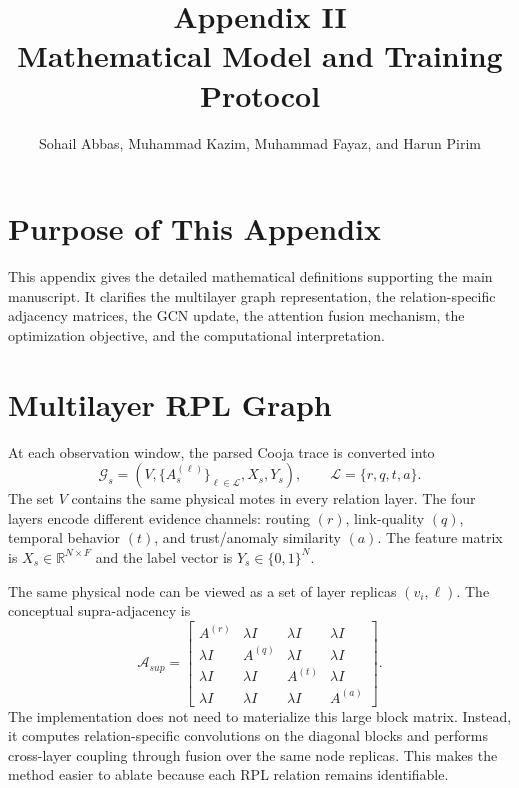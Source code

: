 \documentclass[10pt]{article}
\title{\vspace{-1.2cm}Appendix II\\Mathematical Model and Training Protocol}
\author{Sohail Abbas, Muhammad Kazim, Muhammad Fayaz, and Harun Pirim}
\date{}
\begin{document}
\maketitle

\section{Purpose of This Appendix}
This appendix gives the detailed mathematical definitions supporting the main manuscript. It clarifies the multilayer graph representation, the relation-specific adjacency matrices, the GCN update, the attention fusion mechanism, the optimization objective, and the computational interpretation.

\section{Multilayer RPL Graph}
At each observation window, the parsed Cooja trace is converted into
\begin{equation}
\mathcal{G}_s=(V,\{A_s^{(\ell)}\}_{\ell\in\mathcal{L}},X_s,Y_s),
\qquad
\mathcal{L}=\{r,q,t,a\}.
\label{eq:app2_graph}
\end{equation}
The set $V$ contains the same physical motes in every relation layer. The four layers encode different evidence channels: routing $(r)$, link-quality $(q)$, temporal behavior $(t)$, and trust/anomaly similarity $(a)$. The feature matrix is $X_s\in\mathbb{R}^{N\times F}$ and the label vector is $Y_s\in\{0,1\}^N$.

The same physical node can be viewed as a set of layer replicas $(v_i,\ell)$. The conceptual supra-adjacency is
\begin{equation}
\mathcal{A}_{sup}=
\begin{bmatrix}
A^{(r)} & \lambda I & \lambda I & \lambda I\\
\lambda I & A^{(q)} & \lambda I & \lambda I\\
\lambda I & \lambda I & A^{(t)} & \lambda I\\
\lambda I & \lambda I & \lambda I & A^{(a)}
\end{bmatrix}.
\label{eq:app2_supra}
\end{equation}
The implementation does not need to materialize this large block matrix. Instead, it computes relation-specific convolutions on the diagonal blocks and performs cross-layer coupling through fusion over the same node replicas. This makes the method easier to ablate because each RPL relation remains identifiable.
\end{document}
